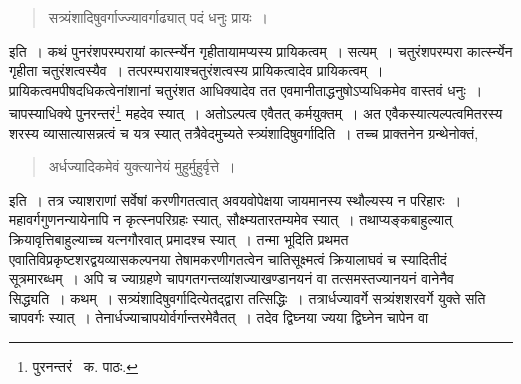 \documentclass[11pt, openany]{book}
\begin{document}
\begin{quote}
{\qt सत्र्यंशादिषुवर्गाज्ज्यावर्गाढ्यात् पदं धनुः प्रायः~।}
\end{quote}

\noindent इति~। कथं पुनरंशपरम्परायां कार्त्स्न्येन गृहीतायामप्यस्य प्रायिकत्वम्~। सत्यम्~। चतुरंशपरम्परा कार्त्स्न्येन गृहीता चतुरंशत्वस्यैव~।
तत्परम्परायाश्चतुरंशत्वस्य प्रायिकत्वादेव प्रायिकत्वम्~। प्रायिकत्वमपीषदधिकत्वेनांशानां चतुरंशत आधिक्यादेव तत एवमानीताद्धनुषोऽप्यधिकमेव वास्तवं धनुः~। चापस्याधिक्ये पुनरन्तरं\renewcommand{\thefootnote}{२}\footnote{पुरनन्तरं \textendash\ क. पाठः.} महदेव स्यात्~। अतोऽल्पत्व एवैतत् कर्मयुक्तम्~। अत एवैकस्यात्यल्पत्वमितरस्य शरस्य व्यासात्यासन्नत्वं च यत्र स्यात् तत्रैवेदमुच्यते स्त्र्यंशादिषुवर्गादिति~। तच्च प्राक्तनेन ग्रन्थेनोक्तं,

\begin{quote}
{\qt अर्धज्यादिकमेवं युक्त्यानेयं मुहुर्मुहुर्वृत्ते~।}
\end{quote}

\noindent इति~। तत्र ज्याशराणां सर्वेषां करणीगतत्वात् अवयवोपेक्षया जायमानस्य स्थौल्यस्य न परिहारः~। महावर्गगुणनन्यायेनापि न कृत्स्नपरिग्रहः स्यात्, सौक्ष्म्यतारतम्यमेव स्यात्~। तथाप्यङ्कबाहुल्यात् क्रियावृत्तिबाहुल्याच्च यत्नगौरवात् प्रमादश्च स्यात्~। तन्मा भूदिति प्रथमत
एवातिविप्रकृष्टशरद्वयव्यासकल्पनया तेषामकरणीगतत्वेन चातिसूक्ष्मत्वं क्रियालाघवं च स्यादितीदं सूत्रमारब्धम्~। अपि च ज्याग्रहणे चापगतगन्तव्यांशज्याखण्डानयनं वा तत्समस्तज्यानयनं वानेनैव सिद्ध्यति~। कथम्~। {\qt सत्र्यंशादिषुवर्गादि}त्येतद्द्वारा तत्सिद्धिः~। तत्रार्धज्यावर्गे सत्र्यंशशरवर्गे युक्ते सति चापवर्गः स्यात्~। तेनार्धज्याचापयोर्वर्गान्तरमेवैतत्~। तदेव द्विघ्नया ज्यया द्विघ्नेन चापेन वा

\newpage
\end{document}
